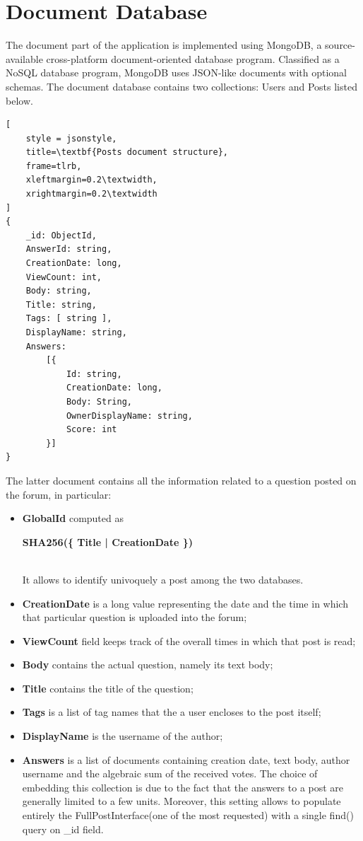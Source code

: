 \documentclass[11pt]{report}
\begin{document}
\section{Document Database}

The document part of the application is implemented using MongoDB, a source-available cross-platform document-oriented database program. Classified as a NoSQL database program, MongoDB uses JSON-like documents with optional schemas. The document database contains two collections: Users and Posts listed below.
\newline

\begin{lstlisting}[
    style = jsonstyle,
    title=\textbf{Posts document structure},
    frame=tlrb,
    xleftmargin=0.2\textwidth,
    xrightmargin=0.2\textwidth
]
{
    _id: ObjectId,
    AnswerId: string,
    CreationDate: long,
    ViewCount: int,
    Body: string,
    Title: string,
    Tags: [ string ],
    DisplayName: string,
    Answers:
        [{
            Id: string,
            CreationDate: long,
            Body: String,
            OwnerDisplayName: string,
            Score: int
        }]
}
\end{lstlisting}

\newpage

The latter document contains all the information related to a question posted on the forum, in particular:
\begin{itemize}
  \item \textbf{GlobalId} computed as \\ 
  \centerline {\textbf{SHA256(\{ Title | CreationDate \})}} \\
  It allows to identify univoquely a post among the two databases.
  \item \textbf{CreationDate} is a long value representing the date and the time in which that particular question is uploaded into the forum;
  \item \textbf{ViewCount} field keeps track of the overall times in which that post is read;
  \item \textbf{Body} contains the actual question, namely its text body;
  \item \textbf{Title} contains the title of the question;
  \item \textbf{Tags} is a list of tag names that the a user encloses to the post itself;
  \item \textbf{DisplayName} is the username of the author;
  \item \textbf{Answers} is a list of documents containing creation date, text body, author username and the algebraic sum of the received votes. The choice of embedding this collection is due to the fact that the answers to a post are generally limited to a few units. Moreover, this setting allows to populate entirely the FullPostInterface(one of the most requested) with a single find() query on \_id field.
\end{itemize}
\end{document}
